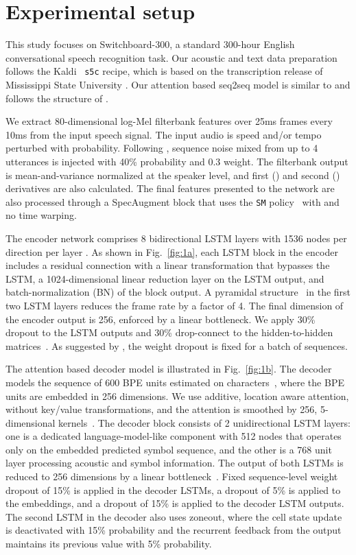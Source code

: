 \documentclass[a4paper]{article}
\begin{document}
\section{Experimental setup}
This study focuses on Switchboard-300, a standard 300-hour English conversational speech recognition task.
Our acoustic and text data preparation follows the Kaldi~\cite{Povey_ASRU2011} \texttt{s5c} recipe, which is based on the transcription release of Mississippi State University \cite{msu}.
Our attention based seq2seq model is similar to \cite{Bahdanau2016,Chan2016} and follows the structure of \cite{Tuske2019}.

We extract 80-dimensional log-Mel filterbank features over 25ms frames every 10ms from the input speech signal.
The input audio is speed and/or tempo perturbed with {\large {}} probability.
Following \cite{Saon2019}, sequence noise mixed from up to 4 utterances is injected with 40\% probability and 0.3 weight.
The filterbank output is mean-and-variance normalized at the speaker level, and first () and second () derivatives are also calculated.
The final features presented to the network are also processed through a SpecAugment block that uses the \texttt{SM} policy~\cite{Park2019} with  and no time warping.

The encoder network comprises 8 bidirectional LSTM layers with 1536 nodes per direction per layer \cite{Hochreiter97,Schuster}. As shown in Fig.~\ref{fig:1a}, each LSTM block in the encoder includes a residual connection with a linear transformation that bypasses the LSTM, a 1024-dimensional linear reduction layer on the LSTM output, and batch-normalization (BN) of the block output. A pyramidal structure~\cite{Chan2016} in the first two LSTM layers reduces the frame rate by a factor of 4.
The final dimension of the encoder output is 256, enforced by a linear bottleneck.
We apply 30\% dropout to the LSTM outputs and 30\% drop-connect to the hidden-to-hidden matrices~\cite{pmlr-v28-wan13,JMLR:v15:srivastava14a}. As suggested by \cite{Gal2016}, the weight dropout is fixed for a batch of sequences.

The attention based decoder model is illustrated in Fig.~\ref{fig:1b}.
The decoder models the sequence of 600 BPE units estimated on characters~\cite{subword-nmt}, where the BPE units are embedded in 256 dimensions.
We use additive, location aware attention, without key/value transformations, and the attention is smoothed by 256, 5-dimensional kernels~\cite{chorowski15}.
The decoder block consists of 2 unidirectional LSTM layers: one is a dedicated language-model-like component with 512 nodes that operates only on the embedded predicted symbol sequence, and the other is a 768 unit layer processing acoustic and symbol information.
The output of both LSTMs is reduced to 256 dimensions by a linear bottleneck~\cite{Vesely2011}.
Fixed sequence-level weight dropout of 15\% is applied in the decoder LSTMs, a dropout of 5\% is applied to the embeddings, and a dropout of 15\% is applied to the decoder LSTM outputs.
The second LSTM in the decoder also uses zoneout, where the cell state update is deactivated with 15\% probability and the recurrent feedback from the output maintains its previous value with 5\% probability.
\end{document}
